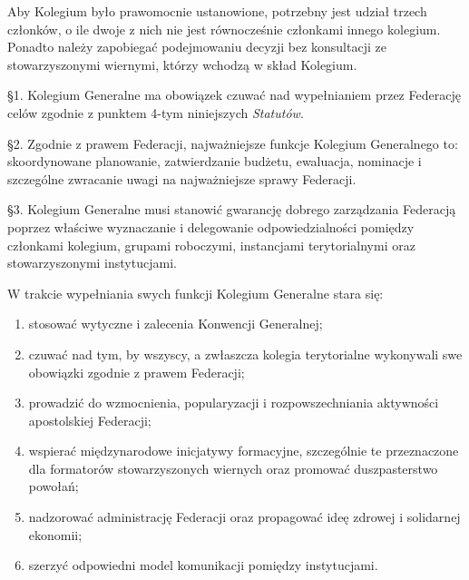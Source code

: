  Aby Kolegium było prawomocnie ustanowione, potrzebny jest udział trzech członków, o ile dwoje z nich nie jest równocześnie członkami innego kolegium. Ponadto należy zapobiegać podejmowaniu decyzji bez konsultacji ze stowarzyszonymi wiernymi, którzy wchodzą w skład Kolegium.
 


 \S{}1. Kolegium Generalne ma obowiązek czuwać nad wypełnianiem przez Federację celów zgodnie z punktem 4-tym niniejszych {\em Statutów}.


\S{}2. Zgodnie z prawem Federacji, najważniejsze funkcje Kolegium Generalnego to: skoordynowane planowanie, zatwierdzanie budżetu, ewaluacja, nominacje i szczególne zwracanie uwagi na najważniejsze sprawy Federacji.


\S{}3. Kolegium Generalne musi stanowić gwarancję dobrego zarządzania Federacją poprzez właściwe wyznaczanie i delegowanie odpowiedzialności pomiędzy członkami kolegium, grupami roboczymi, instancjami terytorialnymi oraz stowarzyszonymi instytucjami.




 W trakcie wypełniania swych funkcji Kolegium Generalne stara się:


\begin{enumerate}


\item stosować wytyczne i zalecenia Konwencji Generalnej;


\item czuwać nad tym, by wszyscy, a zwłaszcza kolegia terytorialne wykonywali swe obowiązki zgodnie z prawem Federacji;


\item prowadzić do wzmocnienia, popularyzacji i rozpowszechniania aktywności apostolskiej Federacji;


\item wspierać międzynarodowe inicjatywy formacyjne, szczególnie te przeznaczone dla formatorów stowarzyszonych wiernych oraz promować duszpasterstwo powołań;


\item nadzorować administrację Federacji oraz propagować ideę zdrowej i solidarnej ekonomii;


\item szerzyć odpowiedni model komunikacji pomiędzy instytucjami.


\end{enumerate}
 

